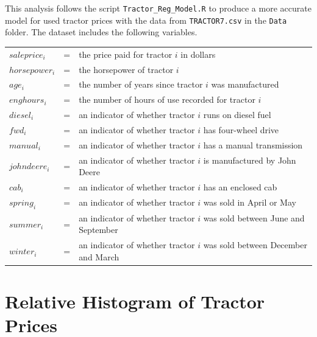 \documentclass[11pt]{book}
\begin{document}
This analysis follows the script \texttt{Tractor\_Reg\_Model.R} to produce a more accurate model for used tractor prices with the data from \texttt{TRACTOR7.csv} in the \texttt{Data} folder. 
The dataset includes the following variables.
\begin{table}[h!]
\begin{tabular}{l l l}

$saleprice_i$ & = & the price paid for tractor $i$ in dollars \\
% 
$horsepower_i$ & = & the horsepower of tractor $i$ \\
$age_i$ & = & the number of years since tractor $i$ was manufactured  \\
$enghours_i$ & = & the number of hours of use recorded for tractor $i$  \\
$diesel_i$ & = & an indicator of whether tractor $i$ runs on diesel fuel \\ %
$fwd_i$ & = & an indicator of whether tractor $i$ has four-wheel drive \\ %
$manual_i$ & = & an indicator of whether tractor $i$ has a manual transmission \\ %
$johndeere_i$ & = & an indicator of whether tractor $i$ is manufactured by John Deere \\ %
$cab_i$ & = & an indicator of whether tractor $i$ has an enclosed cab \\ %
% 
$spring_i$ & = & an indicator of whether tractor $i$ was sold in April or May \\ %
$summer_i$ & = & an indicator of whether tractor $i$ was sold between June and September \\ %
$winter_i$ & = & an indicator of whether tractor $i$ was sold between December and March \\ %

\end{tabular}
\end{table}
%


\vfill
\pagebreak
\section{Relative Histogram of Tractor Prices}
\end{document}
